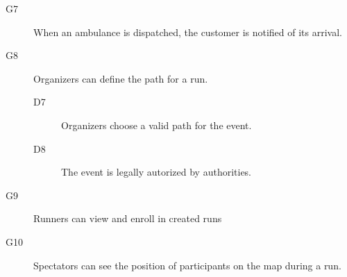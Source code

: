 \documentclass[../main.tex]{subfiles}
\begin{document}
\begin{description}
	\item [G7]  When an ambulance is dispatched, the customer is notified of its arrival.
	\begin{description}
		\item
	\end{description}

	\item [G8]  Organizers can define the path for a run.
	\begin{description}
		\item [D7] Organizers choose a valid path for the event.
		\item [D8] The event is legally autorized by authorities.
	\end{description}

	\item [G9]  Runners can view and enroll in created runs
	\begin{description}
		\item []
	\end{description}

	\item [G10] Spectators can see the position of participants on the map during a run.
	\begin{description}
		\item
	\end{description}
\end{description}
\end{document}
